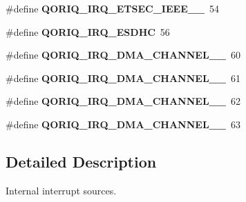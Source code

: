 \begin{DoxyCompactItemize}
\item 
\mbox{\label{group__QoriqInterruptAll_ga32f48113d2a0f54f0ac30c6b123b821f}} 
\#define {\bfseries Q\+O\+R\+I\+Q\+\_\+\+I\+R\+Q\+\_\+\+E\+T\+S\+E\+C\+\_\+\+I\+E\+E\+E\+\_\+\_}~54
\item 
\mbox{\label{group__QoriqInterruptAll_ga83464b1248a5a3ea3ad65c7ea2107142}} 
\#define {\bfseries Q\+O\+R\+I\+Q\+\_\+\+I\+R\+Q\+\_\+\+E\+S\+D\+HC}~56
\item 
\mbox{\label{group__QoriqInterruptAll_ga04a1bb3e78ce22aa15a34bcf9cf18067}} 
\#define {\bfseries Q\+O\+R\+I\+Q\+\_\+\+I\+R\+Q\+\_\+\+D\+M\+A\+\_\+\+C\+H\+A\+N\+N\+E\+L\+\_\+\_}~60
\item 
\mbox{\label{group__QoriqInterruptAll_gacab519fac7a3b8c7239c763cdaad18ac}} 
\#define {\bfseries Q\+O\+R\+I\+Q\+\_\+\+I\+R\+Q\+\_\+\+D\+M\+A\+\_\+\+C\+H\+A\+N\+N\+E\+L\+\_\+\_}~61
\item 
\mbox{\label{group__QoriqInterruptAll_ga5a0523a90a0f816f523a5617eeab54ce}} 
\#define {\bfseries Q\+O\+R\+I\+Q\+\_\+\+I\+R\+Q\+\_\+\+D\+M\+A\+\_\+\+C\+H\+A\+N\+N\+E\+L\+\_\+\_}~62
\item 
\mbox{\label{group__QoriqInterruptAll_gae9e4ff61d3ecb3ad023a43abb42731c8}} 
\#define {\bfseries Q\+O\+R\+I\+Q\+\_\+\+I\+R\+Q\+\_\+\+D\+M\+A\+\_\+\+C\+H\+A\+N\+N\+E\+L\+\_\+\_}~63
\end{DoxyCompactItemize}


\subsection{Detailed Description}
Internal interrupt sources. 

